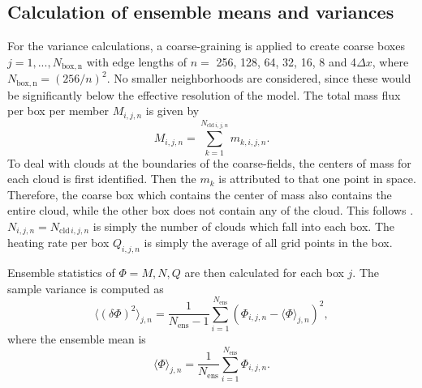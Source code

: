 \documentclass[a4paper, 12pt]{article}
\begin{document}
\subsection{Calculation of ensemble means and variances}
For the variance calculations, a coarse-graining is applied to create coarse boxes $j=1,...,N_{\mathrm{box,n}}$ with edge lengths of $n=$ 256, 128, 64, 32, 16, 8 and 4$\Delta x$, where $N_{\mathrm{box,n}}=(256/n)^2$. No smaller neighborhoods are considered, since these would be significantly below the effective resolution of the model. The total mass flux per box per member $M_{i,j,n}$ is given by
\begin{equation} \label{eq:calc_memM}
 M_{i,j,n} = \sum_{k=1}^{N_{\mathrm{cld}\,i,j,n}} m_{k,i,j,n}.
\end{equation}
To deal with clouds at the boundaries of the coarse-fields, the centers of mass for each cloud is first identified. Then the $m_k$ is attributed to that one point in space. Therefore, the coarse box which contains the center of mass also contains the entire cloud, while the other box does not contain any of the cloud. This follows \cite{Cohen2006}. $N_{i,j,n}=N_{\mathrm{cld}\,i,j,n}$ is simply the number of clouds which fall into each box.  The heating rate per box $Q_{i,j,n}$ is simply the average of all grid points in the box.

Ensemble statistics of $\Phi = M, N, Q$ are then calculated for each box $j$. The sample variance is computed as
\begin{equation} \label{eq:calc_varM}
 \langle (\delta \Phi )^2 \rangle_{j,n} = \frac{1}{N_{\mathrm{ens}}-1} \sum_{i=1}^{N_{\mathrm{ens}}} (\Phi_{i,j,n} - \langle \Phi \rangle_{j,n})^2,
\end{equation}
where the ensemble mean is
\begin{equation} \label{eq:calc_meanM}
 \langle \Phi \rangle_{j,n} = \frac{1}{N_{\mathrm{ens}}} \sum_{i=1}^{N_{\mathrm{ens}}} \Phi_{i,j,n}.
\end{equation}
\end{document}
